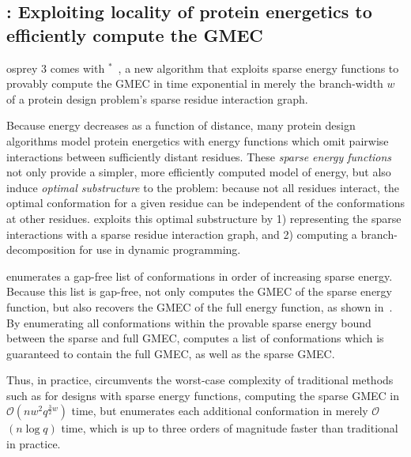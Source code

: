 \def\Oh{$\mathcal{O}$}
\subsection{\bwmstar: Exploiting locality of protein energetics to efficiently compute the GMEC}


{\sc osprey} 3 comes with \bwmstar$^*$~\cite{BWM_JCB}, a new algorithm that exploits sparse energy functions to provably compute the GMEC in time exponential in merely the branch-width $w$ of a protein design problem's sparse residue interaction graph.

Because energy decreases as a function of distance, many protein design algorithms model protein energetics with energy functions which omit pairwise interactions between sufficiently distant residues. These \emph{sparse energy functions} not only provide a simpler, more efficiently computed model of energy, but also induce \emph{optimal substructure} to the problem: because not all residues interact, the optimal conformation for a given residue can be independent of the conformations at other residues. \bwmstar exploits this optimal substructure by 1) representing the sparse interactions with a sparse residue interaction graph, and 2) computing a branch-decomposition for use in dynamic programming. 

\bwmstar enumerates a gap-free list of conformations in order of increasing sparse energy. Because this list is gap-free, \bwmstar not only computes the GMEC of the sparse energy function, but also recovers the GMEC of the full energy function, as shown in~\cite{BWM_JCB}. By enumerating all conformations within the provable sparse energy bound between the sparse and full GMEC, \bwmstar computes a list of conformations which is guaranteed to contain the full GMEC, as well as the sparse GMEC.

Thus, in practice, \bwmstar circumvents the worst-case complexity of traditional methods such as \as for designs with sparse energy functions, computing the sparse GMEC in \Oh$(nw^2q^{\frac{3}{2}w})$ time, but enumerates each additional conformation in merely \Oh$(n\log q)$ time, which is up to three orders of magnitude faster than traditional \as in practice.